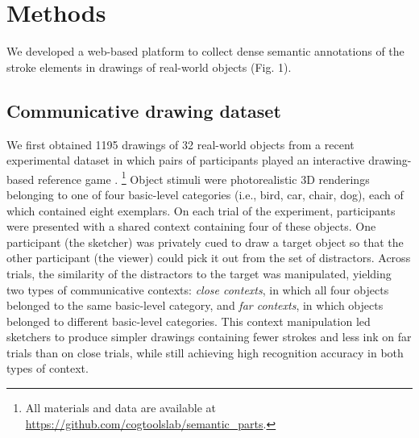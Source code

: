 \documentclass[10pt,letterpaper]{article}
\begin{document}
\section{Methods}

We developed a web-based platform \cite{deLeeuw2015} to collect dense semantic annotations of the stroke elements in drawings of real-world objects (Fig. 1).

\subsection{Communicative drawing dataset}
We first obtained 1195 drawings of 32 real-world objects from a recent experimental dataset in which pairs of participants played an interactive drawing-based reference game . \footnote{All materials and data are available at \url{https://github.com/cogtoolslab/semantic_parts}.}
Object stimuli were photorealistic 3D renderings belonging to one of four basic-level categories (i.e., bird, car, chair, dog), each of which contained eight exemplars. %
On each trial of the experiment, participants were presented with a shared context containing four of these objects. 
One participant (the sketcher) was privately cued to draw a target object so that the other participant (the viewer) could pick it out from the set of distractors. %
Across trials, the similarity of the distractors to the target was manipulated, yielding two types of communicative contexts: \textit{close contexts}, in which all four objects belonged to the same basic-level category, and \textit{far contexts}, in which objects belonged to different basic-level categories. %
This context manipulation led sketchers to produce simpler drawings containing fewer strokes and less ink on far trials than on close trials, while still achieving high recognition accuracy in both types of context.%
 
\end{document}
